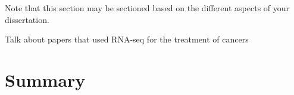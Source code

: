 Note that this section may be sectioned based on the different aspects of your dissertation.

Talk about papers that used RNA-seq for the treatment of cancers







\section{Summary}
